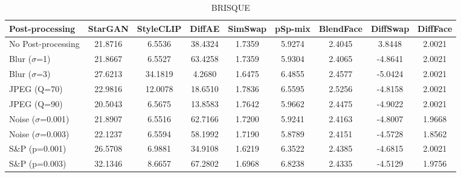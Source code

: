 \documentclass{article}
\begin{document}
\begin{table}[h!]
\begin{subtable}{\textwidth}
\caption{BRISQUE}
\centering
\scriptsize
\begin{tabular}{lcccccccc}
\toprule
\textbf{Post-processing} & StarGAN & StyleCLIP & DiffAE & SimSwap & pSp-mix & BlendFace & DiffSwap & DiffFace \\
\midrule
No Post-processing & 21.8716 & 6.5536 & 38.4324 & 1.7359 & 5.9274 & 2.4045 & 3.8448 & 2.0021 \\
\midrule
Blur ($\sigma$=1) & 21.8667 & 6.5527 & 63.4258 & 1.7359 & 5.9304 & 2.4065 & -4.8641 & 2.0021 \\
Blur ($\sigma$=3) & 27.6213 & 34.1819 & 4.2680 & 1.6475 & 6.4855 & 2.4577 & -5.0424 & 2.0021 \\
JPEG (Q=70) & 22.9816 & 12.0078 & 18.6510 & 1.7836 & 6.5595 & 2.5256 & -4.8158 & 2.0021 \\
JPEG (Q=90) & 20.5043 & 6.5675 & 13.8583 & 1.7642 & 5.9662 & 2.4475 & -4.9022 & 2.0021 \\
Noise ($\sigma$=0.001) & 21.8907 & 6.5516 & 62.7166 & 1.7200 & 5.9241 & 2.4163 & -4.8007 & 1.9668 \\
Noise ($\sigma$=0.003) & 22.1237 & 6.5594 & 58.1992 & 1.7190 & 5.8789 & 2.4151 & -4.5728 & 1.8562 \\
S\&P (p=0.001) & 26.5708 & 6.9881 & 34.9108 & 1.6219 & 6.3522 & 2.4385 & -4.6815 & 2.0021 \\
S\&P (p=0.003) & 32.1346 & 8.6657 & 67.2802 & 1.6968 & 6.8238 & 2.4335 & -4.5129 & 1.9756 \\
\bottomrule
\end{tabular}
\end{subtable}
\end{table}


\clearpage
\end{document}
